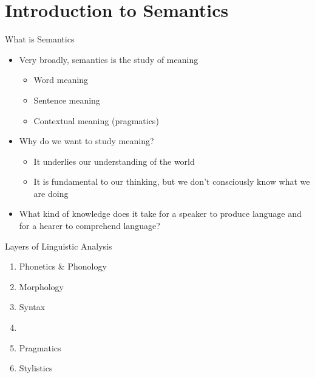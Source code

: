 \section{Introduction to Semantics}

\begin{frame}{What is Semantics}
\begin{itemize}
\item Very broadly, semantics is the study of meaning
  \begin{itemize}
  \item Word meaning
  \item Sentence meaning
  \item Contextual meaning (pragmatics)
  \end{itemize}
\item Why do we want to study meaning?
  \begin{itemize}
  \item It underlies our understanding of the world
  \item It is fundamental to our thinking, but we don't consciously know what we are doing
  \end{itemize}
\item What kind of knowledge does it take for a speaker to produce language and for a hearer to comprehend language? 
\end{itemize}

\end{frame}



\begin{frame}{Layers of Linguistic Analysis}
\begin{enumerate}\addtolength{\itemsep}{-0.75ex}
\item Phonetics \& Phonology
\item Morphology
\item Syntax
\item {}
\item Pragmatics
\item Stylistics
\end{enumerate}
\end{frame}


